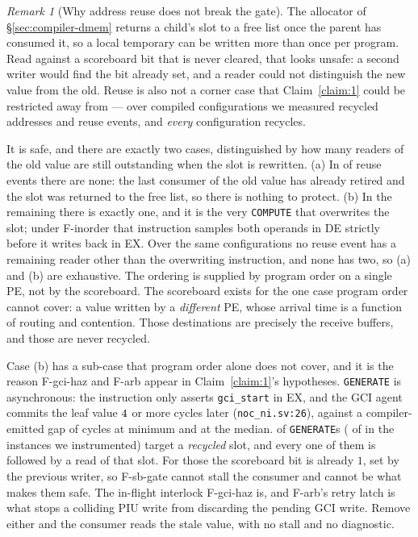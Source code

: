 \documentclass[journal,10pt]{IEEEtran}
\theoremstyle{plain}
\theoremstyle{definition}
\theoremstyle{remark}
\newtheorem*{remark}{Remark}
\newcommand{\sv}[1]{\texttt{#1}}
\begin{document}
\begin{remark}[Why address reuse does not break the gate]
\label{rem:recycle}
The allocator of \S\ref{sec:compiler-dmem} returns a child's slot to a
free list once the parent has consumed it, so a local temporary can be
written more than once per program. Read against a scoreboard bit that is
never cleared, that looks unsafe: a second writer would find the bit already
set, and a reader could not distinguish the new value from the old. Reuse is
also not a corner case that Claim~\ref{claim:1} could be restricted away
from --- over \RecycleConfigs{} compiled configurations we measured
\RecycleAddrs{} recycled addresses and \RecycleEvents{} reuse events, and
\emph{every} configuration recycles.

It is safe, and there are exactly two cases, distinguished by how many
readers of the old value are still outstanding when the slot is rewritten.
(a) In \RecycleZeroReaderPct{} of reuse events there are none: the last
consumer of the old value has already retired and the slot was returned to
the free list, so there is nothing to protect. (b) In the remaining
\RecycleSelfReaderPct{} there is exactly one, and it is the very
\texttt{COMPUTE} that overwrites the slot; under \textsf{F-inorder} that
instruction samples both operands in \textsf{DE} strictly before it writes
back in \textsf{EX}. Over the same configurations no reuse event has a
remaining reader other than the overwriting instruction, and none has two,
so (a) and (b) are exhaustive. The ordering is supplied by program order on
a single PE, not by the scoreboard. The scoreboard exists for the one case
program order cannot cover: a value written by a \emph{different} PE, whose
arrival time is a function of routing and contention. Those destinations are
precisely the receive buffers, and those are never recycled.

Case (b) has a sub-case that program order alone does not cover, and it is
the reason \textsf{F-gci-haz} and \textsf{F-arb} appear in
Claim~\ref{claim:1}'s hypotheses. \texttt{GENERATE} is asynchronous: the
instruction only asserts \sv{gci\_start} in \textsf{EX}, and the GCI agent
commits the leaf value $4$ or more cycles later
(\sv{noc\_ni.sv:26}), against a compiler-emitted gap of \GciGapMin{} cycles
at minimum and \GciGapMedian{} at the median. \GenRecycledPct{} of
\texttt{GENERATE}s (\GenRecycled{} of \GenTotal{} in the instances we
instrumented) target a \emph{recycled} slot, and every one of them is
followed by a read of that slot. For those the scoreboard bit is already
$1$, set by the previous writer, so \textsf{F-sb-gate} cannot stall the
consumer and cannot be what makes them safe. The in-flight interlock
\textsf{F-gci-haz} is, and \textsf{F-arb}'s retry latch is what stops a
colliding PIU write from discarding the pending GCI write. Remove either
and the consumer reads the stale value, with no stall and no diagnostic.


\end{remark}
\end{document}
